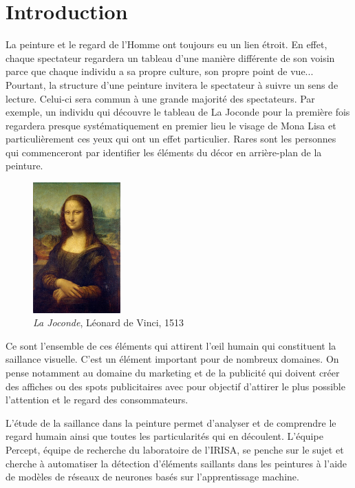 \chapter{Introduction}


\par
La peinture et le regard de l'Homme ont toujours eu un lien étroit. En effet, chaque spectateur regardera un tableau d'une manière différente de son voisin parce que chaque individu a sa propre culture, son propre point de vue... Pourtant, la structure d'une peinture invitera le spectateur à suivre un sens de lecture. Celui-ci sera commun à une grande majorité des spectateurs. Par exemple, un individu qui découvre le tableau de La Joconde pour la première fois regardera presque systématiquement en premier lieu le visage de Mona Lisa et particulièrement ces yeux qui ont un effet particulier. Rares sont les personnes qui commenceront par identifier les éléments du décor en arrière-plan de la peinture.

\begin{figure}[h]
    \centering
    \includegraphics[width=0.3\textwidth]
                    {datas/Mona_Lisa_by_Leonardo_da_Vinci.jpg}
    \caption{\emph{La Joconde}, Léonard de Vinci, 1513}
\end{figure}

\par
Ce sont l'ensemble de ces éléments qui attirent l'\oe{}il humain qui constituent la saillance visuelle. C'est un élément important pour de nombreux domaines. On pense notamment au domaine du marketing et de la publicité qui doivent créer des affiches ou des spots publicitaires avec pour objectif d'attirer le plus possible l'attention et le regard des consommateurs.

\par
L'étude de la saillance dans la peinture permet d'analyser et de comprendre le regard humain ainsi que toutes les particularités qui en découlent. L'équipe Percept, équipe de recherche du laboratoire de l'IRISA, se penche sur le sujet et cherche à automatiser la détection d'éléments saillants dans les peintures à l'aide de modèles de réseaux de neurones basés sur l'apprentissage machine.

